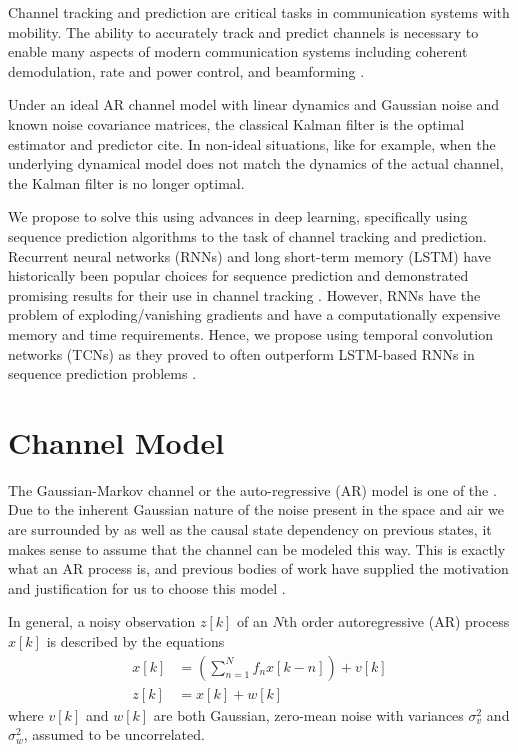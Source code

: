 \documentclass[twocolumn,letterpaper]{IEEEAerospaceCLS}  %
\begin{document}
Channel tracking and prediction are critical tasks in communication systems with mobility. The ability to accurately track and predict channels is necessary to enable many aspects of modern communication systems including coherent demodulation, rate and power control, and beamforming \cite{181202986}. 

Under an ideal AR channel model with linear dynamics and Gaussian noise and known noise covariance matrices, the classical Kalman filter is the optimal estimator and predictor {\color{red} cite}.  In non-ideal situations, like for example, when the underlying dynamical model does not match the dynamics of the actual channel, the Kalman filter is no longer optimal. 

We propose to solve this using advances in deep learning, specifically using sequence prediction algorithms to the task of channel tracking and prediction. Recurrent neural networks (RNNs) and long short-term memory (LSTM) have historically been popular choices for sequence prediction and demonstrated promising results for their use in channel tracking \cite{7508408} \cite{hochreiter1997long}. However, RNNs have the problem of exploding/vanishing gradients and have a computationally expensive memory and time requirements. Hence, we propose using temporal convolution networks (TCNs) as they proved to often outperform LSTM-based RNNs in sequence prediction problems \cite{BaiTCN2018}.  



\section{Channel Model}
\label{sec:channelmodel}

The Gaussian-Markov channel or the auto-regressive (AR) model is one of the . Due to the inherent Gaussian nature of the noise present in the space and air we are surrounded by as well as the causal state dependency on previous states, it makes sense to assume that the channel can be modeled this way. This is exactly what an AR process is, and previous bodies of work have supplied the motivation and justification for us to choose this model \cite{181202986} \cite{baddour2001autoregressive}.

In general, a noisy observation $z[k]$ of an $N$th order autoregressive (AR) process $x[k]$ is described by the equations
\begin{eqnarray*}
x[k]&=\left(\sum_{n=1}^N f_{n}x[k-n]\right) + v[k]\\
z[k]&=x[k] + w[k]
\end{eqnarray*}
where $v[k]$ and $w[k]$ are both Gaussian, zero-mean noise with variances $\sigma_v^2$ and $\sigma_w^2$, assumed to be uncorrelated.
\end{document}

